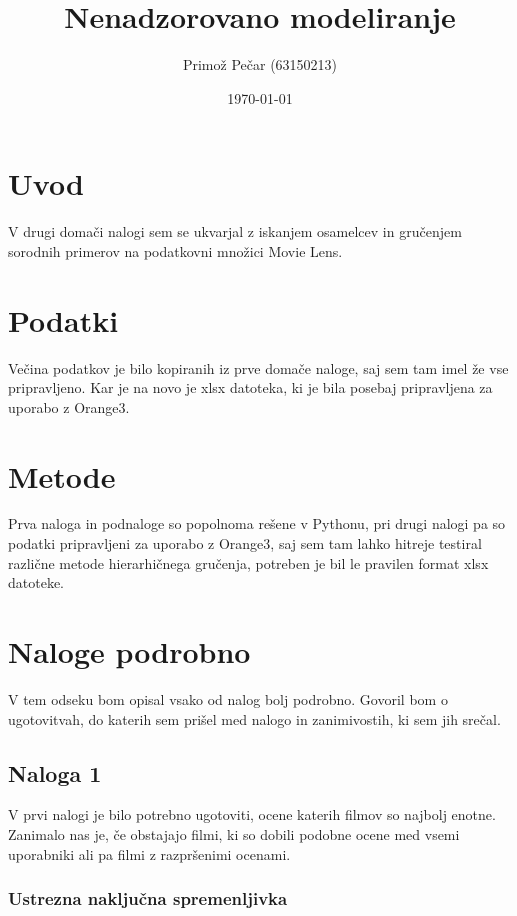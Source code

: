 \documentclass[a4paper,11pt]{article}
\title{Nenadzorovano modeliranje}
\author{Primož Pečar (63150213)}
\date{\today}
\begin{document}
\maketitle

\section{Uvod}

V drugi domači nalogi sem se ukvarjal z iskanjem osamelcev in gručenjem sorodnih primerov na podatkovni množici Movie Lens.

\section{Podatki}

Večina podatkov je bilo kopiranih iz prve domače naloge, saj sem tam imel že vse pripravljeno. Kar je na novo je xlsx datoteka, ki je bila posebaj pripravljena za uporabo z Orange3.


\section{Metode}

Prva naloga in podnaloge so popolnoma rešene v Pythonu, pri drugi nalogi pa so podatki pripravljeni za uporabo z Orange3, saj sem tam lahko hitreje testiral različne metode hierarhičnega gručenja, potreben je bil le pravilen format xlsx datoteke.


\section{Naloge podrobno}

V tem odseku bom opisal vsako od nalog bolj podrobno. Govoril bom o ugotovitvah, do katerih sem prišel med nalogo in zanimivostih, ki sem jih srečal.

\subsection{Naloga 1}

V prvi nalogi je bilo potrebno ugotoviti, ocene katerih filmov so najbolj enotne. Zanimalo nas je, če obstajajo filmi, ki so dobili podobne ocene med vsemi uporabniki ali pa filmi z razpršenimi ocenami.

\subsubsection{Ustrezna naključna spremenljivka}
\end{document}
